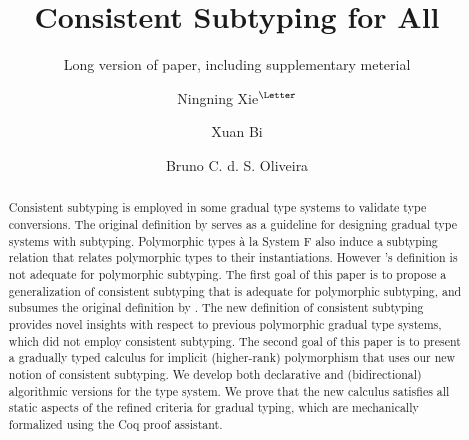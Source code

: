 \documentclass[oribibl,dvipsnames]{llncs}
\begin{document}
\title{Consistent Subtyping for All}
\ifdefined\submitoption
\subtitle{Long version of paper, including supplementary meterial}         %
\fi

\author{Ningning Xie$^{\textrm{\Letter}}$ \and Xuan Bi \and Bruno C. d. S. Oliveira}



\maketitle


\begin{abstract}
Consistent subtyping is employed in some gradual type systems to
validate type conversions. The original
definition by \citeauthor{siek2007gradual} serves as a guideline for
designing gradual type systems with subtyping. Polymorphic types \`a la
System F also induce a subtyping relation that relates polymorphic types
to their instantiations. However \citeauthor{siek2007gradual}'s definition
is not adequate for polymorphic subtyping.
The first goal of this paper is to propose a generalization of consistent
subtyping that is adequate for polymorphic subtyping, and subsumes the original
definition by \citeauthor{siek2007gradual}. The new definition of consistent
subtyping provides novel insights with respect to previous polymorphic gradual
type systems, which did not employ consistent subtyping.
The second goal of this paper is to present a gradually typed calculus for
implicit (higher-rank) polymorphism that uses our new notion of consistent
subtyping. We develop both declarative and (bidirectional) algorithmic versions
for the type system.
We prove that the
new calculus satisfies all static aspects of the refined criteria for gradual
typing, which are mechanically formalized using the Coq proof assistant.
\end{abstract}
\end{document}

